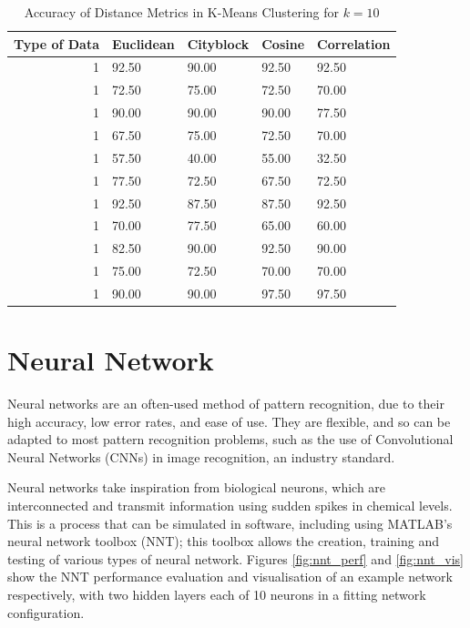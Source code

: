 \documentclass[a4paper, 10pt, conference]{ieeeconf}
\begin{document}
\begin{table}[!ht]
\centering
\caption{Accuracy of Distance Metrics in K-Means Clustering for $k = 10$}
\label{tbl:k10}
\begin{tabular}{|r|llll|}
\hline
\textbf{Type of Data} & \textbf{Euclidean} & \textbf{Cityblock} & \textbf{Cosine} & \textbf{Correlation} \\ \hline
1 & 92.50 & 90.00 & 92.50 & 92.50\\
1 & 72.50 & 75.00 & 72.50 & 70.00\\
1 & 90.00 & 90.00 & 90.00 & 77.50\\
1 & 67.50 & 75.00 & 72.50 & 70.00\\
1 & 57.50 & 40.00 & 55.00 & 32.50\\
1 & 77.50 & 72.50 & 67.50 & 72.50\\
1 & 92.50 & 87.50 & 87.50 & 92.50\\
1 & 70.00 & 77.50 & 65.00 & 60.00\\
1 & 82.50 & 90.00 & 92.50 & 90.00\\
1 & 75.00 & 72.50 & 70.00 & 70.00\\
1 & 90.00 & 90.00 & 97.50 & 97.50\\ \hline
\end{tabular}
\end{table}

\section{Neural Network}


Neural networks are an often-used method of pattern recognition, due to their high accuracy, low error rates, and ease of use. They are flexible, and so can be adapted to most pattern recognition problems, such as the use of Convolutional Neural Networks (CNNs) in image recognition, an industry standard.

Neural networks take inspiration from biological neurons, which are interconnected and transmit information using sudden spikes in chemical levels. This is a process that can be simulated in software, including using MATLAB's neural network toolbox (NNT); this toolbox allows the creation, training and testing of various types of neural network. Figures \ref{fig:nnt_perf} and \ref{fig:nnt_vis} show the NNT performance evaluation and visualisation of an example network respectively, with two hidden layers each of 10 neurons in a fitting network configuration.
\end{document}
